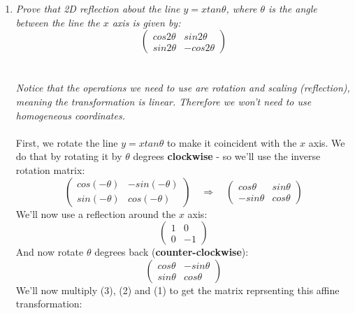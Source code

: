\documentclass{article}
\begin{document}
    \begin{enumerate}
        \item \textsl{
            Prove that 2D reflection about the line $y=xtan\theta$, where $\theta$ is the angle between the line the $x$ axis is given by:
            $$\begin{pmatrix}cos2\theta&sin2\theta\\sin2\theta&-cos2\theta\end{pmatrix}$$
            \\\\
            \noindent
            Notice that the operations we need to use are rotation and scaling (reflection), meaning the transformation is linear. Therefore we won't need to use homogeneous coordinates.
        }\\\\
        First, we rotate the line $y=xtan\theta$ to make it coincident with the $x$ axis. We do that by rotating it by $\theta$ degrees \textbf{clockwise} - so we'll use the inverse rotation matrix:
        \begin{equation}
            \begin{pmatrix}
                cos(-\theta)&-sin(-\theta)\\sin(-\theta)&cos(-\theta)
            \end{pmatrix} \quad\Longrightarrow\quad
            \begin{pmatrix}
                cos\theta&sin\theta\\-sin\theta&cos\theta
            \end{pmatrix}
        \end{equation}
        We'll now use a reflection around the $x$ axis:
        \begin{equation}
            \begin{pmatrix}
                1&0\\0&-1
            \end{pmatrix}
        \end{equation}
        And now rotate $\theta$ degrees back (\textbf{counter-clockwise}):
        \begin{equation}
            \begin{pmatrix}
                cos\theta&-sin\theta\\
                sin\theta&cos\theta
            \end{pmatrix}
        \end{equation}
        We'll now multiply (3), (2) and (1) to get the matrix reprsenting this affine transformation:

\end{enumerate}
\end{document}
